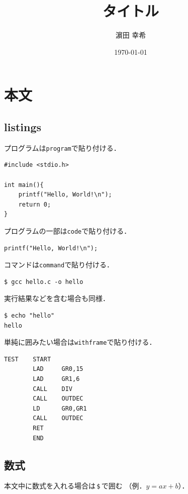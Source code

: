 \documentclass[uplatex]{jsarticle}
\newcommand{\vsc}{\vspace{5pt}}
\newcommand{\vsp}{\vspace{10pt}}
\begin{document}
\title{タイトル}
\author{濵田 幸希}
\date{\today}
\maketitle
\tableofcontents

\newpage
\section{本文}
\subsection{listings}
プログラムは\verb|program|で貼り付ける．

\begin{lstlisting}[style=program,caption=hello.c]
#include <stdio.h>

int main(){
    printf("Hello, World!\n");
    return 0;
}
\end{lstlisting}
\vsp

プログラムの一部は\verb|code|で貼り付ける．

\vsc
\begin{lstlisting}[style=code]
printf("Hello, World!\n");
\end{lstlisting}

コマンドは\verb|command|で貼り付ける．

\vsc
\begin{lstlisting}[style=command]
$ gcc hello.c -o hello
\end{lstlisting}

実行結果などを含む場合も同様．

\vsc
\begin{lstlisting}[style=command]
$ echo "hello"
hello
\end{lstlisting}

単純に囲みたい場合は\verb|withframe|で貼り付ける．

\vsc
\begin{lstlisting}[style=withframe]
TEST    START
        LAD     GR0,15
        LAD     GR1,6
        CALL    DIV
        CALL    OUTDEC
        LD      GR0,GR1
        CALL    OUTDEC
        RET
        END
\end{lstlisting}

\newpage
\subsection{数式}
本文中に数式を入れる場合は\,\verb|$|\,で囲む
（例．$y=ax+b$）．
\end{document}
